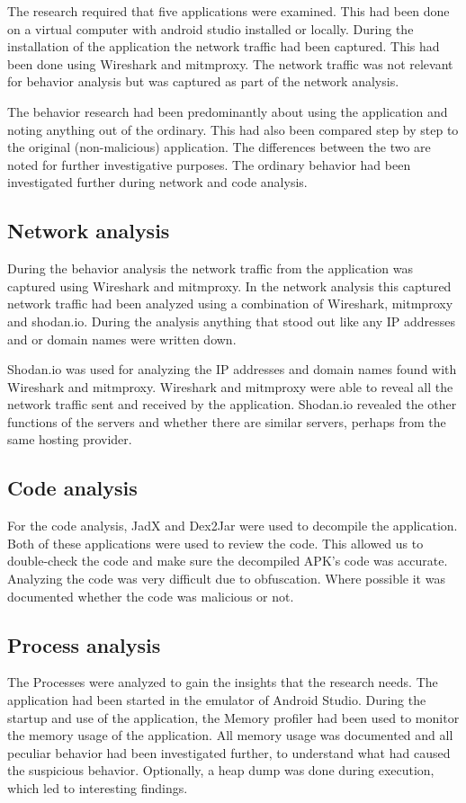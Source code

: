 The research required that five applications were examined. This had been done on a virtual computer with android studio installed or locally. During the installation of the application the network traffic had been captured. This had been done using Wireshark and mitmproxy. The network traffic was not relevant for behavior analysis but was captured as part of the network analysis.

The behavior research had been predominantly about using the application and noting anything out of the ordinary. This had also been compared step by step to the original (non-malicious) application. The differences between the two are noted for further investigative purposes. The ordinary behavior had been investigated further during network and code analysis.

\subsection{Network analysis}

During the behavior analysis the network traffic from the application was captured using Wireshark and mitmproxy. In the network analysis this captured network traffic had been analyzed using a combination of Wireshark, mitmproxy and shodan.io. During the analysis anything that stood out like any IP addresses and or domain names were written down.

Shodan.io was used for analyzing the IP addresses and domain names found with Wireshark and mitmproxy. Wireshark and mitmproxy were able to reveal all the network traffic sent and received by the application. Shodan.io revealed the other functions of the servers and whether there are similar servers, perhaps from the same hosting provider.

\subsection{Code analysis}

For the code analysis, JadX and Dex2Jar were used to decompile the application. Both of these applications were used to review the code. This allowed us to double-check the code and make sure the decompiled APK's code was accurate. Analyzing the code was very difficult due to obfuscation. Where possible it was documented whether the code was malicious or not.

\subsection{Process analysis}
The Processes were analyzed to gain the insights that the research needs. The application had been started in the emulator of Android Studio. During the startup and use of the application, the Memory profiler had been used to monitor the memory usage of the application. All memory usage was documented and all peculiar behavior had been investigated further, to understand what had caused the suspicious behavior. Optionally, a heap dump was done during execution, which led to interesting findings.

